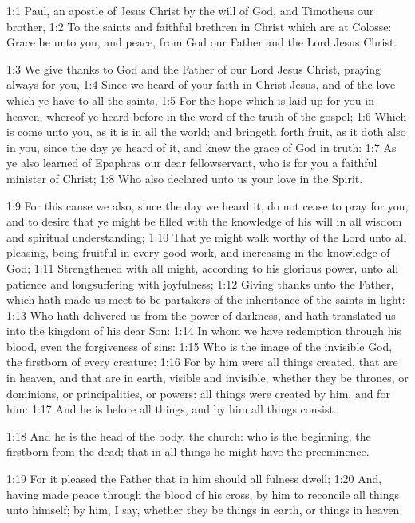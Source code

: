 

1:1  Paul, an apostle of Jesus Christ by the will of God,
and Timotheus our brother, 1:2  To the saints and faithful brethren
in Christ which are at Colosse: Grace be unto you, and peace,
from God our Father and the Lord Jesus Christ.

1:3  We give thanks to God and the Father of our Lord Jesus Christ, praying
always for you,
1:4  Since we heard of your faith in Christ Jesus, and of the love which ye
have to all the saints,
1:5  For the hope which is laid up for you in heaven, whereof ye heard
before in the word of the truth of the gospel;
1:6  Which is come unto you, as it is in all the world; and bringeth forth
fruit, as it doth also in you, since the day ye heard of it, and knew the
grace of God in truth:
1:7  As ye also learned of Epaphras our dear fellowservant, who is for you
a faithful minister of Christ;
1:8  Who also declared unto us your love in the Spirit.

1:9  For this cause we also, since the day we heard it, do not cease to
pray for you, and to desire that ye might be filled with the knowledge of his
will in all wisdom and spiritual understanding;
1:10  That ye might walk worthy of the Lord unto all pleasing, being
fruitful in every good work, and increasing in the knowledge of God;
1:11  Strengthened with all might, according to his glorious power, unto
all patience and longsuffering with joyfulness;
1:12  Giving thanks unto the Father, which hath made us meet to be
partakers of the inheritance of the saints in light:
1:13  Who hath delivered us from the power of darkness, and hath translated
us into the kingdom of his dear Son:
1:14  In whom we have redemption through his blood, even the forgiveness of
sins:
1:15  Who is the image of the invisible God, the firstborn of every
creature:
1:16  For by him were all things created, that are in heaven, and that are
in earth, visible and invisible, whether they be thrones, or dominions, or
principalities, or powers: all things were created by him, and for him:
1:17  And he is before all things, and by him all things consist.

1:18  And he is the head of the body, the church: who is the beginning, the
firstborn from the dead; that in all things he might have the preeminence.

1:19  For it pleased the Father that in him should all fulness dwell;
1:20  And, having made peace through the blood of his cross, by him to
reconcile all things unto himself; by him, I say, whether they be things in
earth, or things in heaven.

